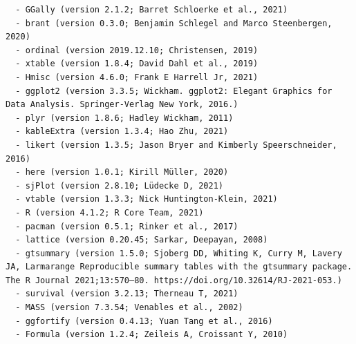 \documentclass[
]{article}
\begin{document}
\begin{verbatim}
  - GGally (version 2.1.2; Barret Schloerke et al., 2021)
  - brant (version 0.3.0; Benjamin Schlegel and Marco Steenbergen, 2020)
  - ordinal (version 2019.12.10; Christensen, 2019)
  - xtable (version 1.8.4; David Dahl et al., 2019)
  - Hmisc (version 4.6.0; Frank E Harrell Jr, 2021)
  - ggplot2 (version 3.3.5; Wickham. ggplot2: Elegant Graphics for Data Analysis. Springer-Verlag New York, 2016.)
  - plyr (version 1.8.6; Hadley Wickham, 2011)
  - kableExtra (version 1.3.4; Hao Zhu, 2021)
  - likert (version 1.3.5; Jason Bryer and Kimberly Speerschneider, 2016)
  - here (version 1.0.1; Kirill Müller, 2020)
  - sjPlot (version 2.8.10; Lüdecke D, 2021)
  - vtable (version 1.3.3; Nick Huntington-Klein, 2021)
  - R (version 4.1.2; R Core Team, 2021)
  - pacman (version 0.5.1; Rinker et al., 2017)
  - lattice (version 0.20.45; Sarkar, Deepayan, 2008)
  - gtsummary (version 1.5.0; Sjoberg DD, Whiting K, Curry M, Lavery JA, Larmarange Reproducible summary tables with the gtsummary package. The R Journal 2021;13:570–80. https://doi.org/10.32614/RJ-2021-053.)
  - survival (version 3.2.13; Therneau T, 2021)
  - MASS (version 7.3.54; Venables et al., 2002)
  - ggfortify (version 0.4.13; Yuan Tang et al., 2016)
  - Formula (version 1.2.4; Zeileis A, Croissant Y, 2010)
\end{verbatim}
\end{document}
